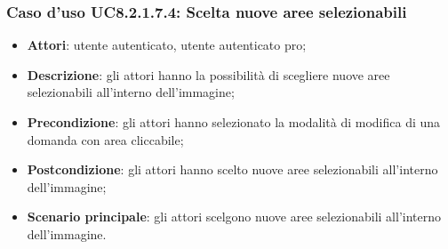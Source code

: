 \subsubsection{Caso d'uso UC8.2.1.7.4: Scelta nuove aree selezionabili}
\begin{itemize}
	\item \textbf{Attori}: utente autenticato, utente autenticato pro;
	\item \textbf{Descrizione}: gli attori hanno la possibilità di scegliere nuove aree selezionabili all'interno dell'immagine;
	\item \textbf{Precondizione}: gli attori hanno selezionato la modalità di modifica di una domanda con area cliccabile; 
	\item \textbf{Postcondizione}: gli attori hanno scelto nuove aree selezionabili all'interno dell'immagine;
	\item \textbf{Scenario principale}: gli attori scelgono nuove aree selezionabili all'interno dell'immagine. 	
\end{itemize}

